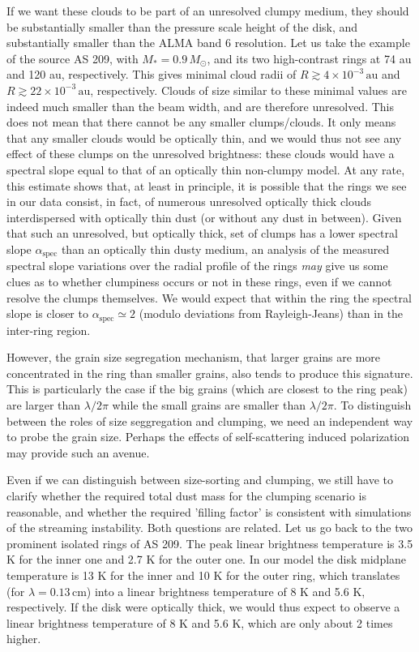 \documentclass{aa}
\begin{document}
If we want these clouds to be part of an unresolved clumpy medium, they should
be substantially smaller than the pressure scale height of the disk, and
substantially smaller than the ALMA band 6 resolution. Let us take the example
of the source AS 209, with $M_{*}=0.9\,M_{\odot}$, and its two high-contrast
rings at 74 au and 120 au, respectively. This gives minimal cloud
radii of $R\gtrsim 4\times 10^{-3}\,\mathrm{au}$ and $R\gtrsim 22\times
10^{-3}\,\mathrm{au}$, respectively. Clouds of size similar to these minimal
values are indeed much smaller than the beam width, and are therefore
unresolved.  This does not mean that there cannot be any smaller
clumps/clouds. It only means that any smaller clouds would be optically thin,
and we would thus not see any effect of these clumps on the unresolved
brightness: these clouds would have a spectral slope equal to that of an
optically thin non-clumpy model. At any rate, this estimate shows that, at least
in principle, it is possible that the rings we see in our data consist, in fact,
of numerous unresolved optically thick clouds interdispersed with optically thin
dust (or without any dust in between). Given that such an unresolved, but
optically thick, set of clumps has a lower spectral slope
$\alpha_{\mathrm{spec}}$ than an optically thin dusty medium, an analysis of the
measured spectral slope variations over the radial profile of the rings {\em
  may} give us some clues as to whether clumpiness occurs or not in these
rings, even if we cannot resolve the clumps themselves. We would expect that
within the ring the spectral slope is closer to $\alpha_{\mathrm{spec}}\simeq 2$
(modulo deviations from Rayleigh-Jeans) than in the inter-ring region.

However, the grain size segregation mechanism, that larger grains are more
concentrated in the ring than smaller grains, also tends to produce this
signature. This is particularly the case if the big grains (which are closest to
the ring peak) are larger than $\lambda/2\pi$ while the small grains are smaller
than $\lambda/2\pi$. To distinguish between the roles of size seggregation and
clumping, we need an independent way to probe the grain size. Perhaps the effects
of self-scattering induced polarization \citep{2015ApJ...809...78K} may provide
such an avenue. 

Even if we can distinguish between size-sorting and clumping, we still have to
clarify whether the required total dust mass for the clumping scenario is
reasonable, and whether the required 'filling factor' is consistent with
simulations of the streaming instability. Both questions are related. Let us go
back to the two prominent isolated rings of AS 209. The peak linear brightness
temperature is 3.5 $\mathrm{K}$ for the inner one and 2.7 $\mathrm{K}$ for the
outer one. In our model the disk midplane temperature is 13 $\mathrm{K}$ for the
inner and 10 $\mathrm{K}$ for the outer ring, which translates (for
$\lambda=0.13\,\mathrm{cm}$) into a linear brightness temperature of
8 $\mathrm{K}$ and 5.6 $\mathrm{K}$, respectively. If the disk were optically
thick, we would thus expect to observe a linear brightness temperature of
8 $\mathrm{K}$ and 5.6 $\mathrm{K}$, which are only about 2 times higher. 
\end{document}
